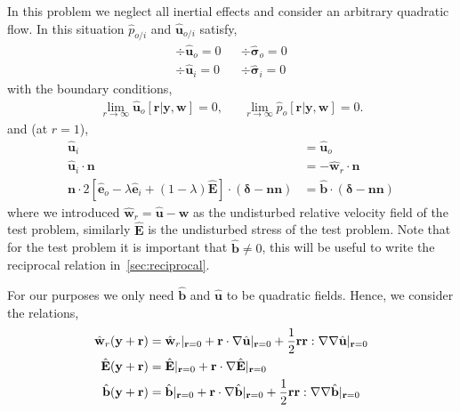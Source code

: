 In this problem we neglect all inertial effects and consider an arbitrary quadratic flow. 
In this situation $\hat{p}_{o/i}$ and $\hat{\textbf{u}}_{o/i}$ satisfy,
\begin{align}
    \div \hat{\textbf{u}}_{o} = 0 
    &&\div\hat{\bm\sigma}_{o}  = 0 
    \label{eq:momentum_out_s}\\
    \div \hat{\textbf{u}}_{i} = 0 
    && \div\hat{\bm\sigma}_{i}  = 0 
    \label{eq:momentum_in_s}
\end{align}
with the boundary conditions, 
\begin{align}
    \lim_{r \to\infty }\hat{\textbf{u}}_{o}[\textbf{r}|\textbf{y},\textbf{w}] = 0,
    && \lim_{r \to\infty }\hat{p}_{o}[\textbf{r}|\textbf{y},\textbf{w}]= 0. 
    \label{eq:BC_r_infty_2}
\end{align}
and (at $r=1$),
\begin{align}
    \label{eq:normal_vel2_s}
    \hat{\textbf{u}}_{i} &= \hat{\textbf{u}}_{o}\\
    \hat{\textbf{u}}_{i} \cdot \textbf{n} &= - \hat{\textbf{w}}_r \cdot \textbf{n}
    \label{eq:normal_vel_s}
    \\
    \label{eq:normal_stres_s}
    \mathbf{n}\cdot 2[\hat{\textbf{e}}_{o} - \lambda \hat{\textbf{e}}_{i} + (1-\lambda) \hat{\textbf{E}}
    ]\cdot (\bm\delta - \textbf{nn})
    &=
    \hat{\textbf{b}}\cdot (\bm\delta - \textbf{nn})
\end{align}
where we introduced $\hat{\textbf{w}}_r = \hat{\textbf{u}} - \textbf{w}$ as the undisturbed relative velocity field of the test problem, similarly $\hat{\textbf{E}}$ is the undisturbed stress of the test problem. 
Note that for the test problem it is important that $\hat{\textbf{b}}\neq 0$, this will be useful to write the reciprocal relation in~\ref{sec:reciprocal}.


For our purposes we only need $\hat{\textbf{b}}$ and $\hat{\textbf{u}}$ to be quadratic fields.
Hence, we consider the relations, 
\begin{align}
    \hat{\textbf{w}}_r(\textbf{y} + \textbf{r}) 
    &=  \hat{\textbf{w}}_r|_{\textbf{r}=0}
    +  \textbf{r} \cdot  \grad\hat{\textbf{u}}|_{\textbf{r}=0}
    +  \frac{1}{2}\textbf{rr} :  \grad\grad\hat{\textbf{u}}|_{\textbf{r}=0}
    \label{eq:w_r_expand}\\
     \hat{\textbf{E}}(\textbf{y} + \textbf{r}) 
    &=   \hat{\textbf{E}}|_{\textbf{r}=0}
    + \textbf{r} \cdot  \grad \hat{\textbf{E}}|_{\textbf{r}=0}
    \\
     \hat{\textbf{b}}(\textbf{y} + \textbf{r}) 
    &=   \hat{\textbf{b}}|_{\textbf{r}=0}
    + \textbf{r} \cdot  \grad \hat{\textbf{b}}|_{\textbf{r}=0}
    + \frac{1}{2}\textbf{rr} :  \grad\grad \hat{\textbf{b}}|_{\textbf{r}=0}
\end{align}

